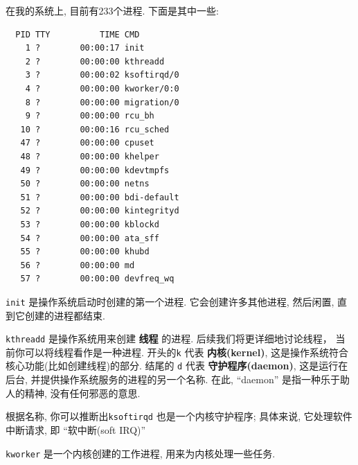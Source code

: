 \documentclass[12pt]{book}
\begin{document}
{在我的系统上, 目前有233个进程.
下面是其中一些:

\begin{verbatim}
  PID TTY          TIME CMD
    1 ?        00:00:17 init
    2 ?        00:00:00 kthreadd
    3 ?        00:00:02 ksoftirqd/0
    4 ?        00:00:00 kworker/0:0
    8 ?        00:00:00 migration/0
    9 ?        00:00:00 rcu_bh
   10 ?        00:00:16 rcu_sched
   47 ?        00:00:00 cpuset
   48 ?        00:00:00 khelper
   49 ?        00:00:00 kdevtmpfs
   50 ?        00:00:00 netns
   51 ?        00:00:00 bdi-default
   52 ?        00:00:00 kintegrityd
   53 ?        00:00:00 kblockd
   54 ?        00:00:00 ata_sff
   55 ?        00:00:00 khubd
   56 ?        00:00:00 md
   57 ?        00:00:00 devfreq_wq
\end{verbatim}

{\tt init} 是操作系统启动时创建的第一个进程.
它会创建许多其他进程, 然后闲置, 
直到它创建的进程都结束.


{\tt kthreadd} 是操作系统用来创建 {\bf 线程} 的进程.
后续我们将更详细地讨论线程， 当前你可以将线程看作是一种进程.
开头的{\tt k} 代表 {\bf 内核(kernel)},
这是操作系统符合核心功能(比如创建线程)的部分.
结尾的 {\tt d} 代表 {\bf 守护程序(daemon)},
这是运行在后台, 并提供操作系统服务的进程的另一个名称.
在此, ``daemon'' 是指一种乐于助人的精神, 没有任何邪恶的意思.
 
根据名称, 你可以推断出{\tt ksoftirqd} 也是一个内核守护程序;
具体来说, 它处理软件中断请求, 即 ``软中断(soft IRQ)''

{\tt kworker} 是一个内核创建的工作进程, 用来为内核处理一些任务.

}
\end{document}
